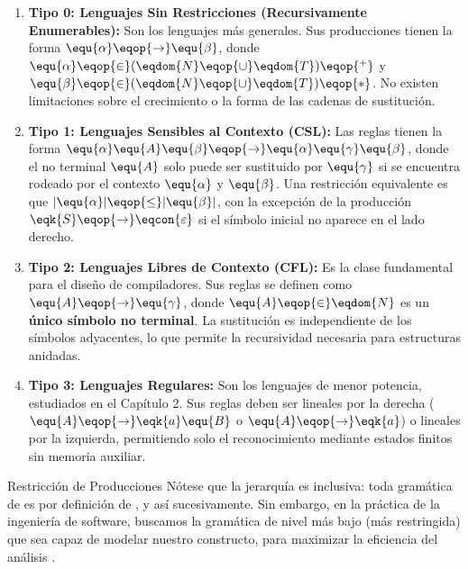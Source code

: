\begin{enumerate}
    \item \textbf{Tipo 0: Lenguajes Sin Restricciones (Recursivamente Enumerables):}
    Son los lenguajes más generales. Sus producciones tienen la forma $\equ{\alpha} \eqop{\rightarrow} \equ{\beta}$, donde $\equ{\alpha} \eqop{\in} (\eqdom{N} \eqop{\cup} \eqdom{T})\eqop{^+}$ y $\equ{\beta} \eqop{\in} (\eqdom{N} \eqop{\cup} \eqdom{T})\eqop{*}$. No existen limitaciones sobre el crecimiento o la forma de las cadenas de sustitución.
    
    \item \textbf{Tipo 1: Lenguajes Sensibles al Contexto (CSL):}
    Las reglas tienen la forma $\equ{\alpha} \equ{A} \equ{\beta} \eqop{\rightarrow} \equ{\alpha} \equ{\gamma} \equ{\beta}$, donde el no terminal $\equ{A}$ solo puede ser sustituido por $\equ{\gamma}$ si se encuentra rodeado por el contexto $\equ{\alpha}$ y $\equ{\beta}$. Una restricción equivalente es que $|\equ{\alpha}| \eqop{\leq} |\equ{\beta}|$, con la excepción de la producción $\eqk{S} \eqop{\rightarrow} \eqcon{\varepsilon}$ si el símbolo inicial no aparece en el lado derecho.
    
    \item \textbf{Tipo 2: Lenguajes Libres de Contexto (CFL):}
    Es la clase fundamental para el diseño de compiladores. Sus reglas se definen como $\equ{A} \eqop{\rightarrow} \equ{\gamma}$, donde $\equ{A} \eqop{\in} \eqdom{N}$ es un \textbf{único símbolo no terminal}. La sustitución es independiente de los símbolos adyacentes, lo que permite la recursividad necesaria para estructuras anidadas.
    
    \item \textbf{Tipo 3: Lenguajes Regulares:}
    Son los lenguajes de menor potencia, estudiados en el Capítulo 2. Sus reglas deben ser lineales por la derecha ($\equ{A} \eqop{\rightarrow} \eqk{a}\equ{B}$ o $\equ{A} \eqop{\rightarrow} \eqk{a}$) o lineales por la izquierda, permitiendo solo el reconocimiento mediante estados finitos sin memoria auxiliar.
\end{enumerate}

\begin{observacion}{Restricción de Producciones}
Nótese que la jerarquía es inclusiva: toda gramática de  es por definición de , y así sucesivamente. Sin embargo, en la práctica de la ingeniería de software, buscamos la gramática de nivel más bajo (más restringida) que sea capaz de modelar nuestro constructo, para maximizar la eficiencia del análisis \cite{aho2006compilers}.
\end{observacion}

